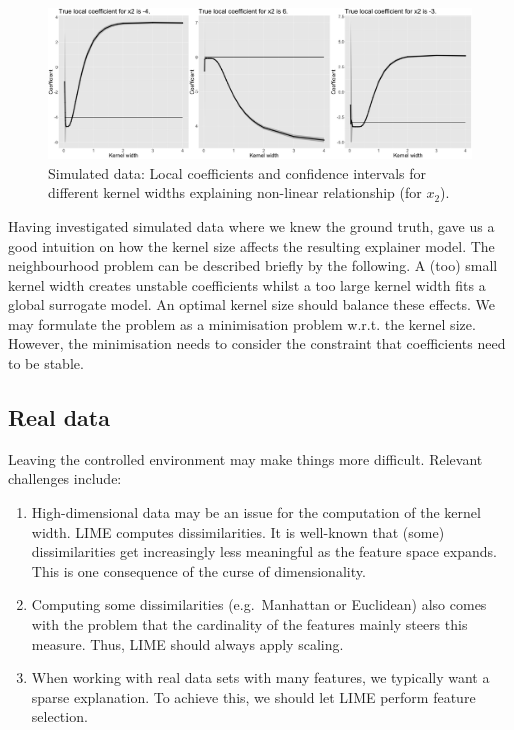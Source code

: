 \documentclass[]{krantz}
\begin{document}
\begin{figure}

{\centering \includegraphics[width=0.99\linewidth]{images/04-09-13} 

}

\caption{Simulated data: Local coefficients and confidence intervals for different kernel widths explaining non-linear relationship (for $x_2$).}\label{fig:lime-fig13}
\end{figure}

Having investigated simulated data where we knew the ground truth, gave
us a good intuition on how the kernel size affects the resulting
explainer model. The neighbourhood problem can be described briefly by
the following. A (too) small kernel width creates unstable coefficients
whilst a too large kernel width fits a global surrogate model. An
optimal kernel size should balance these effects. We may formulate the
problem as a minimisation problem w.r.t. the kernel size. However, the
minimisation needs to consider the constraint that coefficients need to
be stable.

\subsection{Real data}\label{id42}

Leaving the controlled environment may make things more difficult.
Relevant challenges include:

\begin{enumerate}
\def\labelenumi{\arabic{enumi}.}
\item
  High-dimensional data may be an issue for the computation of the
  kernel width. LIME computes dissimilarities. It is well-known that
  (some) dissimilarities get increasingly less meaningful as the feature
  space expands. This is one consequence of the curse of dimensionality.
\item
  Computing some dissimilarities (e.g.~Manhattan or Euclidean) also
  comes with the problem that the cardinality of the features mainly
  steers this measure. Thus, LIME should always apply scaling.
\item
  When working with real data sets with many features, we typically want
  a sparse explanation. To achieve this, we should let LIME perform
  feature selection.
\end{enumerate}
\end{document}
